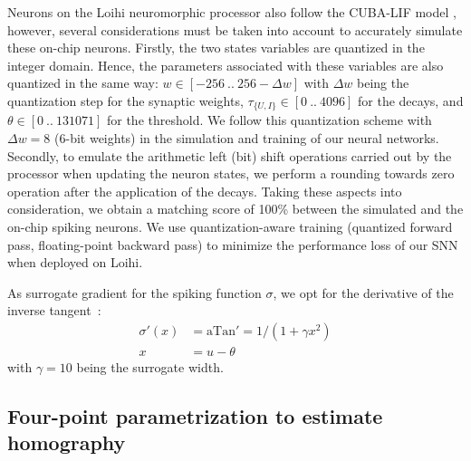 Neurons on the Loihi neuromorphic processor also follow the CUBA-LIF model \cite{davies2018loihi}, however, several considerations must be taken into account to accurately simulate these on-chip neurons. Firstly, the two states variables are quantized in the integer domain. Hence, the parameters associated with these variables are also quantized in the same way: $w\in[-256\ ..\ 256 - \Delta w]$ with $\Delta w$ being the quantization step for the synaptic weights, $\tau_{\{U,I\}}\in[0\ ..\ 4096]$ for the decays, and $\theta\in[0\ ..\ 131071]$ for the threshold. We follow this quantization scheme with $\Delta w=8$ (6-bit weights) in the simulation and training of our neural networks. Secondly, to emulate the arithmetic left (bit) shift operations carried out by the processor when updating the neuron states, we perform a rounding towards zero operation after the application of the decays. Taking these aspects into consideration, we obtain a matching score of 100\% between the simulated and the on-chip spiking neurons. We use quantization-aware training (quantized forward pass, floating-point backward pass) to minimize the performance loss of our SNN when deployed on Loihi.

As surrogate gradient for the spiking function $\sigma$, we opt for the derivative of the inverse tangent~\cite{fang2021incorporating}:
\begin{align}
    \sigma'(x) &= \text{aTan}' = 1/(1 + \gamma x^2) \\
    x &= u - \theta
\end{align}
with $\gamma=10$ being the surrogate width.

\subsection*{Four-point parametrization to estimate homography}

